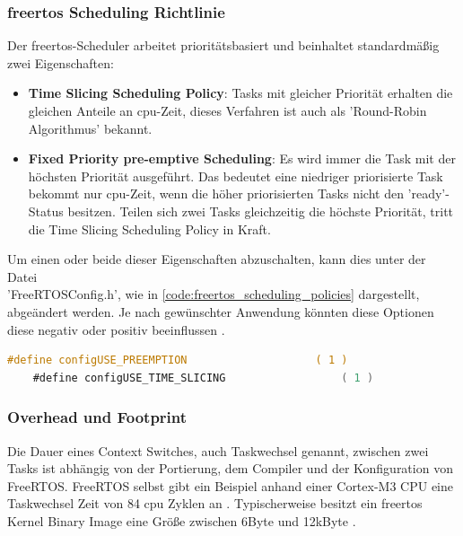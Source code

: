 \documentclass[../EDF Master Thesis.tex]{subfiles}
\begin{document}
\subsubsection{\ac{freertos} Scheduling Richtlinie} \label{section:freertos_scheduling_richtlinie}
Der \ac{freertos}-Scheduler arbeitet prioritätsbasiert und beinhaltet standardmäßig zwei Eigenschaften:
\begin{itemize}
    \item \textbf{Time Slicing Scheduling Policy}: Tasks mit gleicher Priorität erhalten die gleichen Anteile an \ac{cpu}-Zeit, dieses Verfahren ist auch als 'Round-Robin Algorithmus' bekannt.
    \item \textbf{Fixed Priority pre-emptive Scheduling}: Es wird immer die Task  mit der höchsten Priorität ausgeführt.
                                                         Das bedeutet eine niedriger priorisierte Task bekommt nur \ac{cpu}-Zeit, wenn die höher priorisierten Tasks nicht den 'ready'-Status besitzen.
                                                         Teilen sich zwei Tasks gleichzeitig die höchste Priorität, tritt die Time Slicing Scheduling Policy in Kraft.
\end{itemize}
Um einen oder beide dieser Eigenschaften abzuschalten, kann dies unter der Datei \\'FreeRTOSConfig.h', wie in \autoref{code:freertos_scheduling_policies} dargestellt, abgeändert werden.
Je nach gewünschter Anwendung könnten diese Optionen diese negativ oder positiv beeinflussen \parencite{freertos-scheduling-policy}.
\begin{lstlisting}[language=C, caption=FreeRTOS Scheduling Policy Properties, label=code:freertos_scheduling_policies]
    #define configUSE_PREEMPTION                    ( 1 )
    #define configUSE_TIME_SLICING                  ( 1 )
\end{lstlisting}


\subsubsection{Overhead und Footprint} \label{section:overhead_und_footprint}
Die Dauer eines Context Switches, auch Taskwechsel genannt, zwischen zwei Tasks ist abhängig von der Portierung, dem Compiler und der Konfiguration von FreeRTOS.
FreeRTOS selbst gibt ein Beispiel anhand einer Cortex-M3 CPU eine Taskwechsel Zeit von 84 \ac{cpu} Zyklen an \parencite{freertos-overhead}.
Typischerweise besitzt ein \ac{freertos} Kernel Binary Image eine Größe zwischen 6Byte und 12kByte \parencite{freertos-footprint}.
\end{document}

